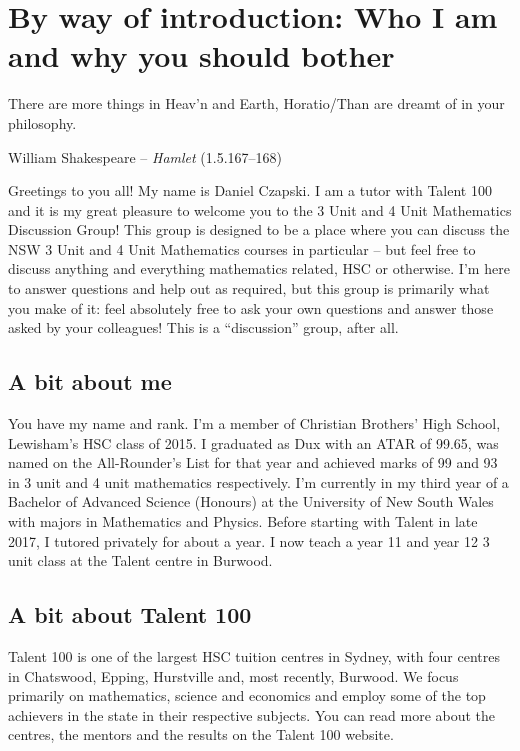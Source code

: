 \documentclass[a4paper,11pt]{article}
\begin{document}
	\section*{By way of introduction: Who I am and why you should bother}
	\epigraph{There are more things in Heav'n and Earth, Horatio/Than are dreamt of in your philosophy.}{William Shakespeare -- \textit{Hamlet }(1.5.167--168)}
	Greetings to you all! My name is Daniel Czapski. I am a tutor with Talent 100 and it is my great pleasure to welcome you to the 3 Unit and 4 Unit Mathematics Discussion Group! This group is designed to be a place where you can discuss the NSW 3 Unit and 4 Unit Mathematics courses in particular -- but feel free to discuss anything and everything mathematics related, HSC or otherwise. I'm here to answer questions and help out as required, but this group is primarily what you make of it: feel absolutely free to ask your own questions and answer those asked by your colleagues! This is a ``discussion'' group, after all. 
	
	\subsection*{A bit about me}
	You have my name and rank. I'm a member of Christian Brothers' High School, Lewisham's HSC class of 2015. I graduated as Dux with an ATAR of 99.65, was named on the All-Rounder's List for that year and achieved marks of 99 and 93 in 3 unit and 4 unit mathematics respectively. I'm currently in my third year of a Bachelor of Advanced Science (Honours) at the University of New South Wales with majors in Mathematics and Physics. Before starting with Talent in late 2017, I tutored privately for about a year. I now teach a year 11 and year 12 3 unit class at the Talent centre in Burwood.
	
	\subsection*{A bit about Talent 100}
	Talent 100 is one of the largest HSC tuition centres in Sydney, with four centres in Chatswood, Epping, Hurstville and, most recently, Burwood. We focus primarily on mathematics, science and economics and employ some of the top achievers in the state in their respective subjects. You can read more about the centres, the mentors and the results on the Talent 100 website.
	
\end{document}
